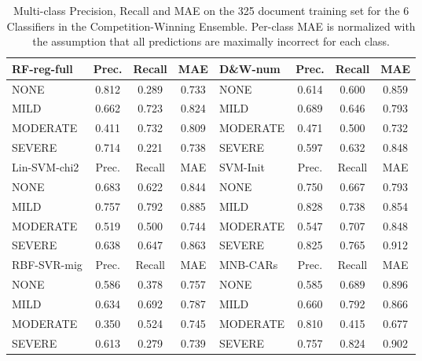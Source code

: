 \begin{table}[]
    \centering
    \begin{tabular}{|l|c|c|c|l|c|c|c|}
          \hline
   \cellcolor{gray!15} \textsf{RF-reg-full} & \textsf{Prec.} & \textsf{Recall} & \textsf{MAE} & \cellcolor{gray!15} \textsf{D\&W-num} & \textsf{Prec.} & \textsf{Recall} & \textsf{MAE} \\
   \hline
    \textsf{NONE} & \cellcolor{gray!15} 0.812 & 0.289 & 0.733 & \textsf{NONE} & 0.614 & 0.600 & \cellcolor{gray!15} 0.859 \\
    \textsf{MILD} & 0.662 & 0.723 & \cellcolor{gray!15} 0.824 & \textsf{MILD} & \cellcolor{gray!15} 0.689 & \cellcolor{gray!15} 0.646 & 0.793 \\
    \textsf{MODERATE} & 0.411 & \cellcolor{gray!15} 0.732 & 0.809 & \textsf{MODERATE} & 0.471 & 0.500 & 0.732 \\
    \textsf{SEVERE} & 0.714 & 0.221 & 0.738 & \textsf{SEVERE} & 0.597 & 0.632 & 0.848 \\
   \hline
   \cellcolor{gray!15} \textsf{Lin-SVM-chi2} & \textsf{Prec.} & \textsf{Recall} & \textsf{MAE} & \cellcolor{gray!15} \textsf{SVM-Init} & \textsf{Prec.} & \textsf{Recall} & \textsf{MAE} \\
   \hline
    \textsf{NONE} & 0.683 & 0.622 & 0.844 & \textsf{NONE} & 0.750 & 0.667 & 0.793 \\
    \textsf{MILD} & \cellcolor{gray!15} 0.757 &\cellcolor{gray!15}  0.792 & \cellcolor{gray!15} 0.885 & \textsf{MILD} & \cellcolor{gray!15} 0.828 & 0.738 & 0.854 \\
    \textsf{MODERATE} & 0.519 & 0.500 & 0.744 & \textsf{MODERATE} & 0.547 & 0.707 & 0.848 \\
    \textsf{SEVERE} & 0.638 & 0.647 & 0.863 & \textsf{SEVERE} & 0.825 & \cellcolor{gray!15} 0.765 & \cellcolor{gray!15} 0.912 \\
   \hline
   \cellcolor{gray!15} \textsf{RBF-SVR-mig} & \textsf{Prec.} & \textsf{Recall} & \textsf{MAE} & \cellcolor{gray!15} \textsf{MNB-CARs} & \textsf{Prec.} & \textsf{Recall} & \textsf{MAE} \\
   \hline
    \textsf{NONE} & 0.586 & 0.378 & 0.757 & \textsf{NONE} & 0.585 & 0.689 & 0.896 \\
    \textsf{MILD} & \cellcolor{gray!15} 0.634 & \cellcolor{gray!15} 0.692 & \cellcolor{gray!15} 0.787 & \textsf{MILD} & 0.660 & \cellcolor{gray!15} 0.792 & 0.866 \\
    \textsf{MODERATE} & 0.350 & 0.524 & 0.745 & \textsf{MODERATE} & \cellcolor{gray!15} 0.810 & 0.415 & 0.677 \\
    \textsf{SEVERE} & 0.613 & 0.279 & 0.739 & \textsf{SEVERE} & 0.757 & 0.824 & \cellcolor{gray!15} 0.902 \\
   \hline
    \end{tabular}
    \caption{Multi-class Precision, Recall and MAE on the 325 document training set for the 6 Classifiers in the Competition-Winning Ensemble. Per-class MAE is normalized with the assumption that all predictions are maximally incorrect for each class.}
    \label{tab:BestEnsembleClassifiersMetrics}
\end{table}

